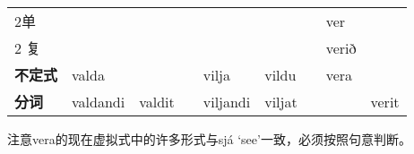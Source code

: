 \begin{longtable}{lllllllll}
    2单             &          &                    &  &            &        &  & ver      &            \\
    2 复            &          &                    &  &            &        &  & verið    &            \\
    \textbf{不定式} & valda    &                    &  & vilja      & vildu  &  & vera     &            \\
    \textbf{分词}   & valdandi & valdit             &  & viljandi   & viljat &  &          &
    verit                                                                                               \\
\end{longtable}

注意vera的现在虚拟式中的许多形式与sjá `see‌'一致，必须按照句意判断。
